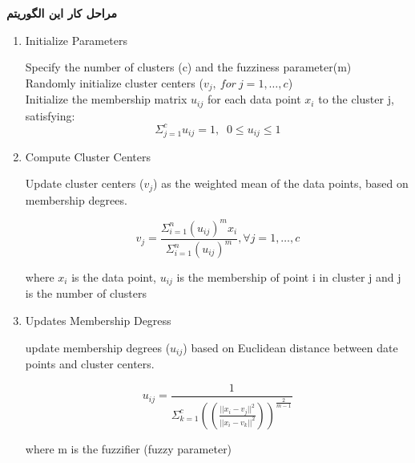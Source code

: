 \documentclass[10pt]{beamer}
\begin{document}
\begin{frame}{}
\textbf{مراحل کار این الگوریتم}

\begin{latin}
	\begin{enumerate}
		\item[\lr{1.}]{Initialize Parameters}
		
\begin{footnotesize}
	Specify the number of clusters (c) and the fuzziness parameter(m)\\
	Randomly initialize cluster centers ($ v_j,\: for \: j=1,\dots,c $)\\
	Initialize the membership matrix $u_{ij}$ for each data point $x_i$ to the cluster j, satisfying:
	\[ \Sigma_{j=1}^c u_{ij} =1, \; \; 0 \le u_{ij} \le 1 \]
\end{footnotesize}
	\item[\lr{2.}]{Compute Cluster Centers}
	
\begin{footnotesize}
Update cluster centers ($v_j$) as the weighted mean of the data points, based on membership degrees.
\end{footnotesize}
\[
	v_j= \frac{\Sigma_{i=1}^{n} (u_{ij})^m x_i}{\Sigma_{i=1}^{n} (u_{ij})^m} , \forall j=1,\dots,c
\]
\begin{scriptsize}
	where $x_i$ is the data point, $u_{ij}$ is the membership of point i in cluster j and j is the number of clusters
\end{scriptsize}

	\item[\lr{3.}]{Updates Membership Degress}
	
\begin{footnotesize}
	update membership degrees ($u_{ij}$) based on Euclidean distance between date points and cluster centers.
\end{footnotesize}
\[
	u_{ij}= \frac{1}{\Sigma_{k=1}^{c}((\frac{||x_i-v_j||^2}{||x_i-v_k||^2}))^\frac{2}{m-1}}
\]

\begin{scriptsize}
	where m is the fuzzifier (fuzzy parameter)
\end{scriptsize}
\end{enumerate}
\end{latin}
\end{frame}
	
\end{document}
